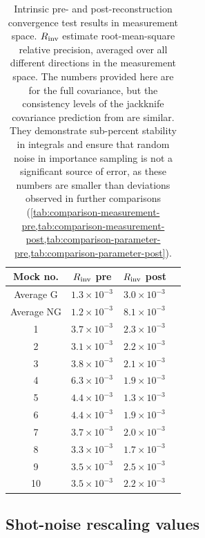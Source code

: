 \begin{table}
\centering
\begin{tabular}{|c|c|c|c|}
\hline
Mock no. & $R_{\rm inv}$ pre & $R_{\rm inv}$ post \\
\hline
Average G & $1.3 \times 10^{-3}$ & $3.0 \times 10^{-3}$ \\
Average NG & $1.2 \times 10^{-3}$ & $8.1 \times 10^{-3}$ \\
\hline
1 & $3.7 \times 10^{-3}$ & $2.3 \times 10^{-3}$ \\
2 & $3.1 \times 10^{-3}$ & $2.2 \times 10^{-3}$ \\
3 & $3.8 \times 10^{-3}$ & $2.1 \times 10^{-3}$ \\
4 & $6.3 \times 10^{-3}$ & $1.9 \times 10^{-3}$ \\
5 & $4.4 \times 10^{-3}$ & $1.3 \times 10^{-3}$ \\
6 & $4.4 \times 10^{-3}$ & $1.9 \times 10^{-3}$ \\
7 & $3.7 \times 10^{-3}$ & $2.0 \times 10^{-3}$ \\
8 & $3.3 \times 10^{-3}$ & $1.7 \times 10^{-3}$ \\
9 & $3.5 \times 10^{-3}$ & $2.5 \times 10^{-3}$ \\
10 & $3.5 \times 10^{-3}$ & $2.2 \times 10^{-3}$ \\
\hline
\end{tabular}
\caption[\rascalc{} convergence test results for \desimtwo{} mocks]{Intrinsic pre- and post-reconstruction convergence test results in measurement space.
$R_{\rm inv}$ estimate root-mean-square relative precision, averaged over all different directions in the measurement space.
The numbers provided here are for the full covariance, but the consistency levels of the jackknife covariance prediction from \rascalc{} are similar.
They demonstrate sub-percent stability in \rascalc{} integrals and ensure that random noise in importance sampling is not a significant source of error, as these numbers are smaller than deviations observed in further comparisons (\cref{tab:comparison-measurement-pre,tab:comparison-measurement-post,tab:comparison-parameter-pre,tab:comparison-parameter-post}).}
\label{tab:internal-convergence}
\end{table}

\subsection{Shot-noise rescaling values}
\label{subsec:shot-noise-rescaling}

